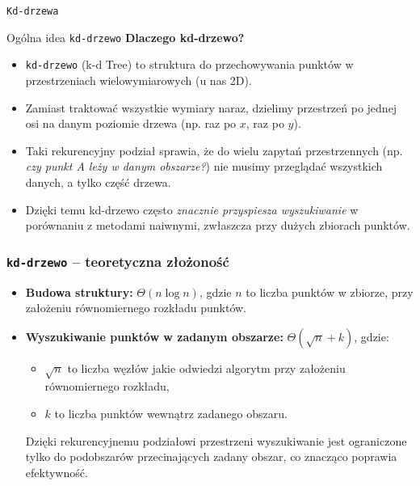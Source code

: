 \documentclass[aspectratio=1610, polish]{beamer}
\begin{document}
\begin{section}{\texttt{Kd-drzewa}}

\begin{frame}{Ogólna idea \texttt{kd-drzewo}}
    \textbf{Dlaczego kd-drzewo?}\\
    \vspace{0.4em}
    \begin{itemize}
        \item \texttt{kd-drzewo} (k-d Tree) to struktura do przechowywania punktów 
              w przestrzeniach wielowymiarowych (u nas 2D).
        \item Zamiast traktować wszystkie wymiary naraz, dzielimy przestrzeń 
              po jednej osi na danym poziomie drzewa (np. raz po \(x\), raz po \(y\)).
        \item Taki rekurencyjny podział sprawia, że do wielu zapytań przestrzennych
              (np. \textit{czy punkt A leży w danym obszarze?})
              nie musimy przeglądać wszystkich danych, a tylko część drzewa.
        \item Dzięki temu kd-drzewo często \textit{znacznie przyspiesza wyszukiwanie} 
              w porównaniu z metodami naiwnymi, 
              zwłaszcza przy dużych zbiorach punktów.
    \end{itemize}
\end{frame}

\begin{frame}
        \frametitle{\texttt{kd-drzewo} -- teoretyczna złożoność}
            
        \begin{itemize}
            \item \textbf{Budowa struktury:}  
            \(\Theta(n \log n)\), gdzie \(n\) to liczba punktów w zbiorze, przy założeniu równomiernego rozkładu punktów.
        \pause
        \vspace{0.5cm}
            \item \textbf{Wyszukiwanie punktów w zadanym obszarze:}  
        \(\Theta(\sqrt{n} + k)\), gdzie:
        \begin{itemize}
            \item \(\sqrt{n}\) to liczba węzłów jakie odwiedzi algorytm przy założeniu równomiernego rozkładu,
            \item \(k\) to liczba punktów wewnątrz zadanego obszaru.  
        \end{itemize}
        Dzięki rekurencyjnemu podziałowi przestrzeni wyszukiwanie jest ograniczone tylko do podobszarów przecinających zadany obszar, co znacząco poprawia efektywność.
        \end{itemize}
    

\end{frame}
\end{section}
\end{document}
